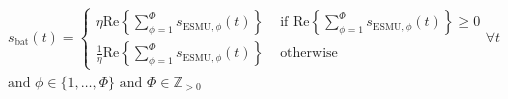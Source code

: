 \begin{equation}
\begin{split}
	s_\text{bat}(t) = 
	\begin{cases}
		\eta\text{Re}\left\{\sum_{\phi=1}^{\Phi}s_{\text{ESMU},\phi}(t)\right\} &\text{ if } \text{Re}\left\{\sum_{\phi=1}^{\Phi}s_{\text{ESMU},\phi}(t)\right\} \geq 0\\
		\frac{1}{\eta}\text{Re}\left\{\sum_{\phi=1}^{\Phi}s_{\text{ESMU},\phi}(t)\right\} &\text{ otherwise}
	\end{cases} \forall t \\
	\text{and } \phi \in \{1, \dots, \Phi\} \text{ and } \Phi \in \mathbb{Z}_{>0}
\end{split}
\label{ch1:equ:battery-power-definition}
\end{equation}